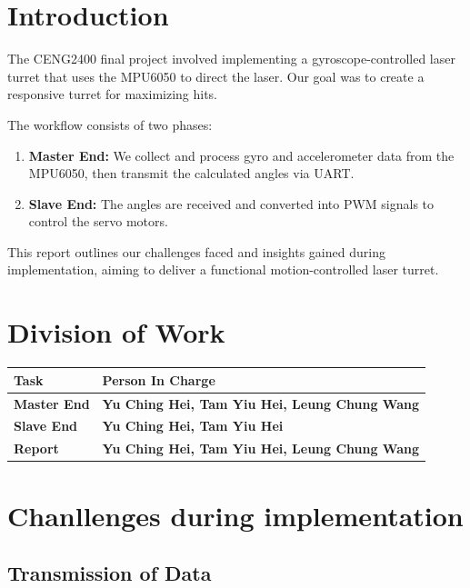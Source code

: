 \documentclass[12pt, a4paper]{article}
\begin{document}
\section{Introduction}
The CENG2400 final project involved implementing a gyroscope-controlled laser turret 
that uses the MPU6050 to direct the laser. Our goal was to create a responsive turret for maximizing hits.

\noindent The workflow consists of two phases:
\begin{enumerate}
    \item \textbf{Master End:} We collect and process gyro and accelerometer 
          data from the \\MPU6050, then transmit the calculated angles via UART.
    \item \textbf{Slave End:} The angles are received and converted into PWM 
          signals to control the servo motors.
\end{enumerate}
This report outlines our challenges faced and insights gained during implementation, aiming to deliver a functional motion-controlled laser turret.

\section{Division of Work}
\begin{tabularx}{\textwidth}{|l||X|}
    \hline
    \textbf{Task} & \textbf{Person In Charge} \\
    \hline\hline
    \textbf{Master End} & \textbf{Yu Ching Hei, Tam Yiu Hei, Leung Chung Wang} \\
    \hline
    \textbf{Slave End} & \textbf{Yu Ching Hei, Tam Yiu Hei} \\
    \hline
    \textbf{Report} & \textbf{Yu Ching Hei, Tam Yiu Hei, Leung Chung Wang} \\
    \hline
\end{tabularx}

\section{Chanllenges during implementation}
\subsection{Transmission of Data}
\end{document}
